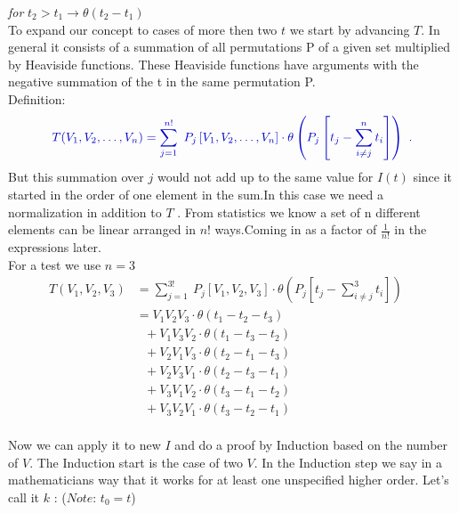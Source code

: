 \documentclass[12pt, titlepage]{article}
\begin{document}
\begin{subappendices}
\textit{for} $ t_2 > t_1  \rightarrow \theta (t_2 -t_1)$\\
To expand our concept to cases of more then  two $  t $ we start by advancing $ T $.
In general it consists of a summation of all permutations P of a given set multiplied by Heaviside functions. These Heaviside functions have arguments with the negative summation of the t in the same permutation P.\\
Definition:
\begin{equation}\textcolor[RGB]{0,0,204}{
T(V_1, V_2,\ldots,V_n)=
\sum_{j=1}^{n!}\ P_{j}
\left[
V_1, V_2,\ldots,V_n
 \right]  
\cdot
\theta \left(P_{j}\left[t_{j} -\sum_{i\neq j}^{n} t_{i}\right]\right)\ .
}
\end{equation}
But this summation over $ j $ would not add up to the same value for $ I(t) $ since it started in the order of one element in the sum.In this case we need a normalization in addition to $ T $ . From statistics we know a set of n different elements can be linear arranged in $ n! $ ways.Coming in as a factor of $ \frac{1}{n!} $ in the expressions later.
\\
For a test we use $ n=3 $
\begin{subequations}
\begin{align}
T(V_1, V_2,V_3)
&=
\sum_{j=1}^{3!}\ P_{j}
\left[
V_1, V_2,V_3
 \right]  
\cdot
\theta \left(P_{j}\left[t_{j} -\sum_{i\neq j}^{3} t_{i}\right]\right)\
&\\
&=V_{1}V_{2}V_{3}\cdot \theta(t_{1}-t_{2}-t_{3})
	&\\
	& \ \ \ +V_{1}V_{3}V_{2} \cdot \theta(t_{1}-t_{3}-t_{2})
	&\\
	& \ \ \ +V_{2}V_{1}V_{3} \cdot \theta(t_{2}-t_{1}-t_{3})
	&\\
	& \ \ \ +V_{2}V_{3}V_{1} \cdot \theta(t_{2}-t_{3}-t_{1})
	&\\
	& \ \ \ +V_{3}V_{1}V_{2} \cdot \theta(t_{3}-t_{1}-t_{2})
	&\\
	& \ \ \ +V_{3}V_{2}V_{1} \cdot \theta(t_{3}-t_{2}-t_{1})
\end{align}
\end{subequations}
\\
Now we can apply it to new $ I $ and do a proof by Induction based on the number of $ V $. The Induction start is the case of two $ V $. In the Induction step we say in a mathematicians way that it works for at least one unspecified higher order. Let's call it $ k $ : ($ \textit{Note:} $ $ t_0 = t $)\\
\begin{equation}

\end{equation}
\end{subappendices}
\end{document}
